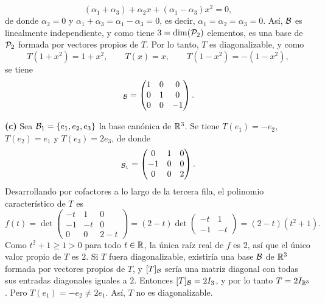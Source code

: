 \documentclass[12pt,a4paper]{article}
\begin{document}
\begin{solucion}
\begin{equation*}
            (\alpha_{1}+\alpha_{3})+\alpha_{2}x+(\alpha_{1}-\alpha_{3})x^{2}=0,
        \end{equation*}
        de donde $\alpha_{2}=0$ y $\alpha_{1}+\alpha_{3}=\alpha_{1}-\alpha_{3}=0$, es decir, $\alpha_{1}=\alpha_{2}=\alpha_{3}=0$. Así, $\mathcal{B}$ es linealmente independiente, y como tiene $3=\dim(\mathcal{P}_{2})$ elementos, es una base de $\mathcal{P}_{2}$ formada por vectores propios de $T$. Por lo tanto, $T$ es diagonalizable, y como
        \begin{equation*}
            T(1+x^{2})=1+x^{2},\qquad T(x)=x,\qquad T(1-x^{2})=-(1-x^{2}),
        \end{equation*}
        se tiene
        \begin{equation*}
            [T]_{\BB}=
            \begin{pmatrix}
                1 & 0 & 0\\
                0 & 1 & 0\\
                0 & 0 & -1
            \end{pmatrix}.
        \end{equation*}

        \textbf{(c)} Sea $\mathcal{B}_{1}=\{e_{1},e_{2},e_{3}\}$ la base canónica de $\mathbb{R}^{3}$. Se tiene $T(e_{1})=-e_{2}$, $T(e_{2})=e_{1}$ y $T(e_{3})=2e_{3}$, de donde
        \begin{equation*}
            [T]_{\BB_{1}}=
            \begin{pmatrix}
                0 & 1 & 0\\
                -1 & 0 & 0\\
                0 & 0 & 2
            \end{pmatrix}.
        \end{equation*}
        Desarrollando por cofactores a lo largo de la tercera fila, el polinomio característico de $T$ es
        \begin{equation*}
            f(t)=
            \det\begin{pmatrix}
                -t & 1 & 0\\
                -1 & -t & 0\\
                0 & 0 & 2-t
            \end{pmatrix}
            =(2-t)
            \det\begin{pmatrix}
                -t & 1\\
                -1 & -t
            \end{pmatrix}
            =(2-t)(t^{2}+1).
        \end{equation*}
        Como $t^{2}+1\geq1>0$ para todo $t\in\mathbb{R}$, la única raíz real de $f$ es $2$, así que el único valor propio de $T$ es $2$. Si $T$ fuera diagonalizable, existiría una base $\mathcal{B}$ de $\mathbb{R}^{3}$ formada por vectores propios de $T$, y $[T]_{\mathcal{B}}$ sería una matriz diagonal con todas sus entradas diagonales iguales a $2$. Entonces $[T]_{\mathcal{B}}=2I_{3}$, y por lo tanto $T=2I_{\mathbb{R}^{3}}$. Pero $T(e_{1})=-e_{2}\neq2e_{1}$. Así, $T$ no es diagonalizable.
    \end{solucion}
\end{document}
